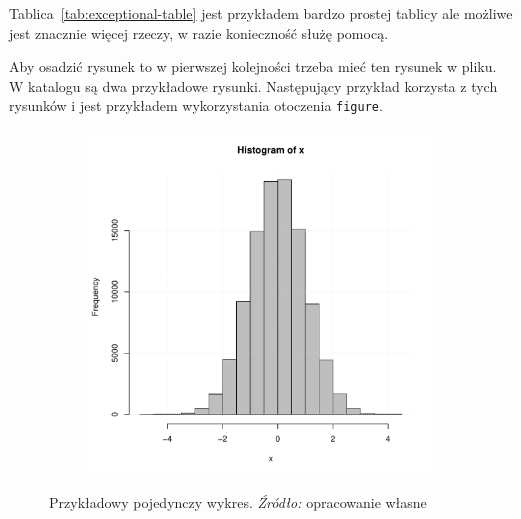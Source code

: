 \documentclass[polish, twoside, 12pt, a4paper]{article}
\theoremstyle{definition}
\theoremstyle{plain}
\theoremstyle{remark}
\begin{document}
Tablica~\ref{tab:exceptional-table} jest przykładem bardzo prostej tablicy ale możliwe jest znacznie więcej rzeczy, w razie konieczność służę pomocą.

Aby osadzić rysunek to w pierwszej kolejności trzeba mieć ten rysunek w pliku. W katalogu są dwa przykładowe rysunki. Następujący przykład korzysta z tych rysunków i jest przykładem wykorzystania otoczenia \verb+figure+.

\begin{figure}[hbt]
  \centering

  \begin{subfigure}[t]{0.45\textwidth}
    \includegraphics[width=\textwidth]{./figure-1}
  \end{subfigure}

  \captionsetup{margin=10pt,font=small,labelfont=bf,width=.8\textwidth}

  \caption[Krótka nazwa X]{Przykładowy pojedynczy wykres. \textit{Źródło:} opracowanie własne}\label{fig:xxx1}
\end{figure}
\end{document}

